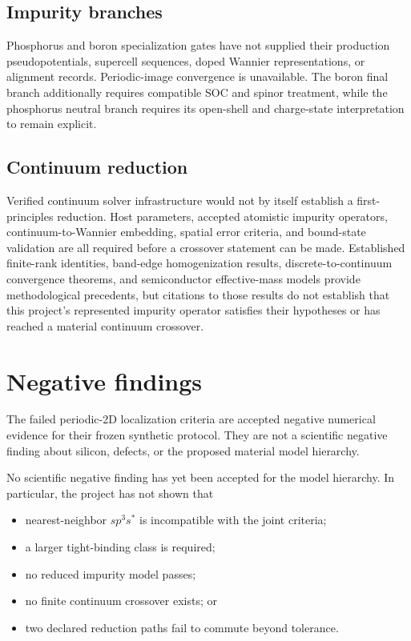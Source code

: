 \subsection{Impurity branches}

Phosphorus and boron specialization gates have not supplied their production
pseudopotentials, supercell sequences, doped Wannier representations, or
alignment records. Periodic-image convergence is unavailable. The boron final
branch additionally requires compatible SOC and spinor treatment, while the
phosphorus neutral branch requires its open-shell and charge-state
interpretation to remain explicit.

\subsection{Continuum reduction}

Verified continuum solver infrastructure would not by itself establish a
first-principles reduction. Host parameters, accepted atomistic impurity
operators, continuum-to-Wannier embedding, spatial error criteria, and
bound-state validation are all required before a crossover statement can be
made. Established finite-rank identities, band-edge homogenization results,
discrete-to-continuum convergence theorems, and semiconductor effective-mass
models provide methodological precedents, but citations to those results do not
establish that this project's represented impurity operator satisfies their
hypotheses or has reached a material continuum crossover.

\section{Negative findings}


The failed periodic-2D localization criteria are accepted negative numerical
evidence for their frozen synthetic protocol. They are not a scientific
negative finding about silicon, defects, or the proposed material model
hierarchy.

No scientific negative finding has yet been accepted for the model hierarchy.
In particular, the project has not shown that

\begin{itemize}
  \item nearest-neighbor $sp^3s^{\ast}$ is incompatible with the joint criteria;
  \item a larger tight-binding class is required;
  \item no reduced impurity model passes;
  \item no finite continuum crossover exists; or
  \item two declared reduction paths fail to commute beyond tolerance.
\end{itemize}


